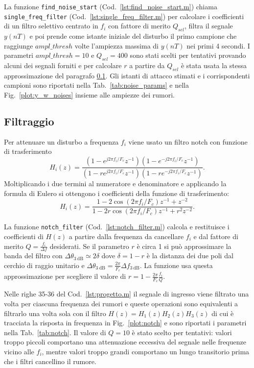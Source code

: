 \documentclass{article}
\newcommand{\fig}[1]{Fig.~\ref{#1}}
\newcommand{\cod}[1]{Cod.~\ref{#1}}
\newcommand{\tab}[1]{Tab.~\ref{#1}}
\newcommand{\inlcd}[1]{\lstinline[basicstyle=\ttfamily,keywordstyle={}]{#1}}
\begin{document}
La funzione \inlcd{find_noise_start} (\cod{lst:find_noise_start.m})
chiama \inlcd{single_freq_filter} (\cod{lst:single_freq_filter.m}) per
calcolare i coefficienti di un filtro selettivo centrato in $f_i$ con
fattore di merito $Q_\mathit{sel}$, filtra il segnale $y(nT)$ e poi
prende come istante iniziale del disturbo il primo campione che
raggiunge $\mathit{ampl\_thresh}$ volte l'ampiezza massima di $y(nT)$ nei
primi 4 secondi. I parametri $\mathit{ampl\_thresh} = 10$ e $Q_\mathit{sel}
= 400$ sono stati scelti per tentativi provando alcuni dei segnali
forniti e per calcolare $r$ a partire da $Q_\mathit{sel}$ è stata usata la
stessa approssimazione del paragrafo \ref{sec:filtraggio}.
Gli istanti di attacco stimati e i corrispondenti campioni
sono riportati nella \tab{tab:noise_params} e nella
\fig{plot:y_w_noises} insieme alle ampiezze dei rumori.

\subsection{Filtraggio}
\label{sec:filtraggio}
Per attenuare un disturbo a frequenza $f_i$ viene usato un filtro
notch con funzione di trasferimento
\begin{equation}
  H_i(z) = \frac{(1 - e^{j2\pi f_i/F_c}z^{-1})(1 - e^{-j2\pi f_i/F_c}z^{-1})}
    {(1 - re^{j2\pi f_i/F_c}z^{-1})(1 - re^{-j2\pi f_i/F_c}z^{-1})}.
\end{equation}
Moltiplicando i due termini al numeratore e denominatore e applicando
la formula di Eulero si ottengono i coefficienti della funzione di
trasferimento:
\begin{equation}
  H_i(z) = \frac{1 - 2\cos(2\pi f_i/F_c)z^{-1} + z^{-2}}
  {1 - 2r\cos(2\pi f_i/F_c)z^{-1} + r^2z^{-2}}.
\end{equation}

La funzione \inlcd{notch_filter} (\cod{lst:notch_filter.m}) calcola e
restituisce i coefficienti di $H(z)$ a partire dalla frequenza da
cancellare $f_i$ e dal fattore di merito $Q = \frac{f_i}{\Delta f}$
desiderati. Se il parametro $r$ è circa 1 si può approssimare la banda
del filtro con $\Delta \theta_{\SI{3}{\dB}} \simeq 2\delta$ dove
$\delta = 1 - r$ è la distanza dei due poli dal cerchio di raggio
unitario e $\Delta \theta_{\SI{3}{\dB}} = \frac{2\pi}{F_c}\Delta
f_{\SI{3}{\dB}}$. La funzione usa questa approssimazione per scegliere
il valore di $r = 1 - \frac{2\pi}{F_c} \frac{f_i}{Q}$.

Nelle righe 35-36 del \cod{lst:progetto.m} il segnale di ingresso
viene filtrato una volta per ciascuna frequenza dei rumori e queste
operazioni sono equivalenti a filtrarlo una volta sola con il filtro
$H(z) = H_1(z)H_2(z)H_3(z)$ di cui è tracciata la risposta in
frequenza in \fig{plot:notch} e sono riportati i parametri nella
\tab{tab:notch}. Il valore di $Q = 10$ è stato scelto per tentativi:
valori troppo piccoli comportano una attenuazione eccessiva del
segnale nelle frequenze vicino alle $f_i$, mentre valori troppo grandi
comportano un lungo transitorio prima che i filtri cancellino il
rumore.
\end{document}
